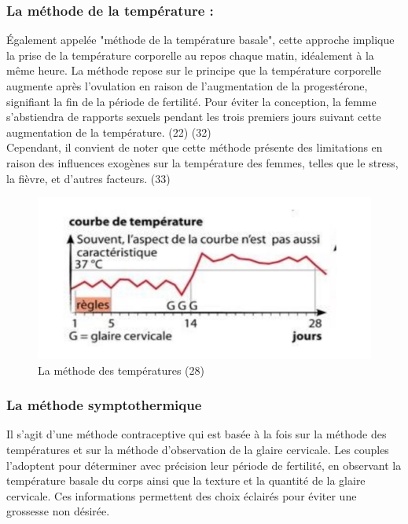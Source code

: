 \subsubsection{La méthode de la température :}
Également appelée "méthode de la température basale", cette approche implique la prise de la température corporelle au repos chaque matin, idéalement à la même heure. La méthode repose sur le principe que la température corporelle augmente après l'ovulation en raison de l'augmentation de la progestérone, signifiant la fin de la période de fertilité. Pour éviter la conception, la femme s'abstiendra de rapports sexuels pendant les trois premiers jours suivant cette augmentation de la température. (22) (32) \\

\noindent Cependant, il convient de noter que cette méthode présente des limitations en raison des influences exogènes sur la température des femmes, telles que le stress, la fièvre, et d'autres facteurs. (33)\\

\begin{figure}[H]
  \centering
  \includegraphics{Images/fig_15.jpg}
  \caption{La méthode des températures (28)}
\end{figure}

\subsubsection{La méthode symptothermique}
Il s’agit d’une méthode contraceptive qui est basée à la fois sur la méthode des températures et sur la méthode d’observation de la glaire cervicale. Les couples l'adoptent pour déterminer avec précision leur période de fertilité, en observant la température basale du corps ainsi que la texture et la quantité de la glaire cervicale. Ces informations permettent des choix éclairés pour éviter une grossesse non désirée.\\

